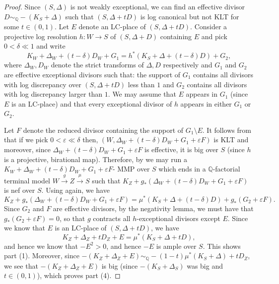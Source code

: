 \documentclass[11pt,reqno]{amsart}
\newcommand{\Q}{\mathbb{Q}}
\numberwithin{equation}{section}
\theoremstyle{definition}
\begin{document}
\begin{proof}
    Since $(S, \Delta)$ is not weakly exceptional, we can find an effective divisor $D \sim_\Q -(K_S + \Delta)$ such that $(S, \Delta + tD)$ is log canonical but not KLT for some $t \in (0,1)$. Let $E$ denote an LC-place of $(S, \Delta + tD)$. Consider a projective log resolution  $h: W \to S$ of $(S, \Delta + D)$ containing $E$ and pick $0 < \delta \ll 1$ and write 
    \begin{equation} \label{eqn:logrespullback} K_W + \Delta_W + (t - \delta) D_W + G_1 = h^* (K_S + \Delta + (t- \delta)D) + G_2 , \end{equation}
    where $\Delta_W, D_W$ denote the strict transforms of $\Delta, D$ respectively and $G_1 $ and $G_2$ are effective exceptional divisors such that: the support of $G_1$ contains all divisors with log discrepancy over $(S, \Delta + tD)$ less than $1$ and $G_2$ contains all divisors with log discrepancy larger than $1$. We may assume that $E$ appears in $G_1$ (since $E$ is an LC-place) and that every exceptional divisor of $h$ appears in either $G_1$ or $G_2$.  

    Let $F$ denote the reduced divisor containing the support of $G_1 \setminus E$. It follows from  that if we pick $0 < \varepsilon \ll \delta$ then, $(W, \Delta_W + (t - \delta)D_W + G_1 + \varepsilon F) $ is KLT and moreover, since $\Delta_W + (t - \delta)D_W + G_1 + \varepsilon F $ is effective, it is big over $S$ (since $h$ is a projective, birational map). Therefore, by \cite[Theorem 6.5]{TanakaMMPforlogsurfaces} we may run a $K_W + \Delta_W + (t - \delta)D_W + G_1 + \varepsilon F$- MMP over $S$ which ends in a $\Q$-factorial terminal model $W \overset{g}{\to} Z \overset{\mu} {\to} S$ such that $K_Z + g_* (\Delta_W + (t - \delta)D_W + G_1 + \varepsilon F)$ is nef over $S$. Using  again, we have
    \[K_Z + g_* (\Delta_W + (t - \delta)D_W + G_1 + \varepsilon F) = \mu ^*(K_S + \Delta + (t - \delta)D) + g_* (G_2 + \varepsilon F)  .  \]
    Since $G_2$ and $F$ are effective divisors, by the negativity lemma, we must have that $g_* (G_2 + \varepsilon F) = 0$, so that $g$ contracts all $h$-exceptional divisors except $E$. Since we know that $E$ is an LC-place of $(S, \Delta + tD)$, we have
    \begin{equation} \label{eqn:specialdivisorpullback} K_Z + \Delta_Z + tD_Z + E = \mu^* (K_S + \Delta + tD),  \end{equation}
    and hence we know that $-E^2 > 0$, and hence $-E$ is ample over $S$. This shows part (1). Moreover, since $- (K_Z + \Delta_Z + E) \sim_\Q -(1- t)\mu^*(K_S + \Delta) + t D_Z $, 
    we see that $- (K_Z + \Delta_Z + E)$ is big (since $-(K_S + \Delta_S)$ was big and $t \in (0,1)$), which proves part (4).


\end{proof}
\end{document}
